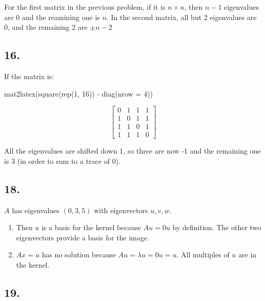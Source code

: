 \documentclass[
]{article}
\newenvironment{Shaded}{\begin{snugshade}}{\end{snugshade}}
\newcommand{\AttributeTok}[1]{\textcolor[rgb]{0.00,0.34,0.68}{#1}}
\newcommand{\DecValTok}[1]{\textcolor[rgb]{0.69,0.50,0.00}{#1}}
\newcommand{\FunctionTok}[1]{\textcolor[rgb]{0.39,0.29,0.61}{#1}}
\newcommand{\NormalTok}[1]{\textcolor[rgb]{0.12,0.11,0.11}{#1}}
\newcommand{\SpecialCharTok}[1]{\textcolor[rgb]{0.24,0.68,0.91}{#1}}
\begin{document}
For the first matrix in the previous problem, if it is \(n \times n\),
then \(n-1\) eigenvalues are 0 and the reamining one is \(n\). In the
second matrix, all but 2 eigenvalues are 0, and the remaining 2 are
\(\pm n -2\)

\hypertarget{section-14}{%
\subsection{16.}\label{section-14}}

If the matrix is:

\begin{Shaded}
\begin{Highlighting}[]
\FunctionTok{mat2latex}\NormalTok{(}\FunctionTok{square}\NormalTok{(}\FunctionTok{rep}\NormalTok{(}\DecValTok{1}\NormalTok{, }\DecValTok{16}\NormalTok{)) }\SpecialCharTok{{-}} \FunctionTok{diag}\NormalTok{(}\AttributeTok{nrow =} \DecValTok{4}\NormalTok{))}
\end{Highlighting}
\end{Shaded}

\[
\begin{bmatrix}
0 & 1 & 1 & 1\\
1 & 0 & 1 & 1\\
1 & 1 & 0 & 1\\
1 & 1 & 1 & 0
\end{bmatrix}
\]

All the eigenvalues are shifted down 1, so three are now -1 and the
remaining one is 3 (in order to sum to a trace of 0).

\hypertarget{section-15}{%
\subsection{18.}\label{section-15}}

\(A\) has eigenvalues \((0, 3, 5)\) with eigenvectors \(u, v, w\).

\begin{enumerate}
\def\labelenumi{\alph{enumi}.}
\item
  Then \(u\) is a basis for the kernel because \(Au = 0u\) by
  definition. The other two eigenvectors provide a basis for the image.
\item
  \(Ax =u\) has no solution because \(Au = \lambda u = 0u = u\). All
  multiples of \(u\) are in the kernel.
\end{enumerate}

\hypertarget{section-16}{%
\subsection{19.}\label{section-16}}
\end{document}
